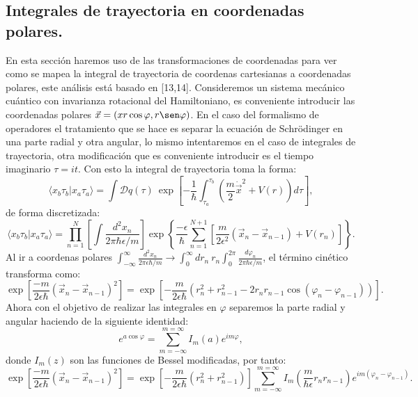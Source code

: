 \subsection{Integrales de trayectoria en coordenadas polares.}
En esta sección haremos uso de las transformaciones de coordenadas para ver como se mapea la integral de trayectoria de coordenas cartesianas a coordenadas polares, este análisis está basado en [13,14]. Consideremos un sistema mecánico cuántico con invarianza rotacional del Hamiltoniano, es conveniente introducir las coordenadas polares $\vec{x}=(x r\cos \varphi,r\sen \varphi)$. En el caso del formalismo de operadores el tratamiento que se hace es separar la ecuación de Schrödinger en una parte radial y otra angular, lo mismo intentaremos en el caso de integrales de trayectoria, otra modificación que es conveniente introducir es el tiempo imaginario $\tau=it$. Con esto la integral de trayectoria toma la forma:
\begin{equation}
\langle x_{b}\tau_{b}|x_{a}\tau_{a}\rangle=\int\mathcal{D}q(\tau)\ \exp\left[-\frac{1}{\hbar}\int_{\tau_{a}}^{\tau_{b}}\left(\frac{m}{2}\dot{\vec{x}}^{2}+V(r)\right)d\tau\right],
\end{equation}
de forma discretizada:
\begin{equation}
\langle x_{b}\tau_{b}|x_{a}\tau_{a}\rangle=\prod_{n=1}^{N}\left[\int\frac{d^{2}x_{n}}{2\pi\hbar\epsilon/m}\right]\exp\left\{ \frac{-\epsilon}{\hbar}\sum_{n=1}^{N+1}\left[\frac{m}{2\epsilon^{2}}(\vec{x}_{n}-\vec{x}_{n-1})+V(r_{n})\right]\right\} .
\end{equation}
Al ir a coordenas polares $\int_{-\infty}^{\infty}\frac{d^{2}x_{n}}{2\pi\epsilon\hbar/m}\to\int_{0}^{\infty}dr_{n}\ r_{n}\int_{0}^{2\pi}\frac{d\varphi_{n}}{2\pi\hbar\epsilon/m}$, el término cinético transforma como:
\begin{equation}
\exp\left[\frac{-m}{2\epsilon\hbar}(\vec{x}_{n}-\vec{x}_{n-1})^{2}\right]=\exp\left[-\frac{m}{2\epsilon\hbar}(r_{n}^{2}+r_{n-1}^{2}-2r_{n}r_{n-1}\cos(\varphi_{n}-\varphi_{n-1}))\right] .
\end{equation}
Ahora con el objetivo de realizar las integrales en $\varphi$ separemos la parte radial y angular haciendo de la siguiente identidad:
\begin{equation}
e^{a\cos\varphi}=\sum_{m=-\infty}^{m=\infty}I_{m}(a)e^{im\varphi},
\end{equation}
donde $I_m(z)$ son las funciones de Bessel modificadas, por tanto:
\begin{equation}
\exp\left[\frac{-m}{2\epsilon\hbar}(\vec{x}_{n}-\vec{x}_{n-1})^{2}\right]=\exp\left[-\frac{m}{2\epsilon\hbar}(r_{n}^{2}+r_{n-1}^{2})\right]\sum_{m=-\infty}^{m=\infty}I_{m}\left(\frac{m}{\hbar\epsilon}r_{n}r_{n-1}\right)e^{im(\varphi_{n}-\varphi_{n-1})} .
\end{equation}
